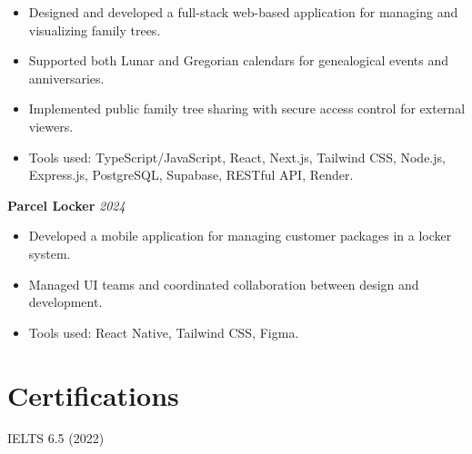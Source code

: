 \documentclass[10pt,a4paper]{article}
\begin{document}
\begin{itemize}[leftmargin=*]
    \item Designed and developed a full-stack web-based application for managing and visualizing family trees.
    
    \item Supported both Lunar and Gregorian calendars for genealogical events and anniversaries.
    
    \item Implemented public family tree sharing with secure access control for external viewers.
    
    \item Tools used: TypeScript/JavaScript, React, Next.js, Tailwind CSS, Node.js, Express.js, PostgreSQL, Supabase, RESTful API, Render.
\end{itemize}

\vspace{0.2cm}

\noindent
\textbf{Parcel Locker} \hfill \textit{2024}

\begin{itemize}[leftmargin=*]
    \item Developed a mobile application for managing customer packages in a locker system.
    
    \item Managed UI teams and coordinated collaboration between design and development.
    
    \item Tools used: React Native, Tailwind CSS, Figma.
\end{itemize}


\section*{Certifications}

IELTS 6.5 (2022)
\end{document}
